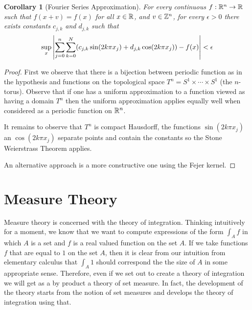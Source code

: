 \documentclass{amsart}
\newtheorem{cor}[thm]{Corollary}
\theoremstyle{remark}
\theoremstyle{definition}
\begin{document}
\begin{cor}[Fourier Series Approximation]\label{FourierSeries}For
  every continuous $f : \mathbb{R}^n \to \mathbb{R}$ such that $f(x + v) =
  f(x)$ for all $x \in \mathbb{R}$, and $v \in \mathbb{Z}^n$, for every
$\epsilon > 0$  there exists constants $c_{j,k}$ and
$d_{j,k}$ such that 
\begin{align*}
\sup_x \left \vert \sum_{j=0}^n \sum_{k=0}^N (c_{j,k} \sin(2k\pi x_j) + d_{j,k}
\cos(2k\pi x_j)) - f(x) \right \vert < \epsilon
\end{align*}
\end{cor}
\begin{proof}First we observe that there is a bijection between
  periodic function as in the hypothesis and functions on the
  topological space $T^n = S^1 \times \cdots \times S^1$ (the $n$-torus).
Observe that if one has a uniform approximation to a function
viewed as having a domain $T^n$ then the uniform approximation applies
equally well when considered as a periodic function on $\mathbb{R}^n$.

It remains to observe that $T^n$ is compact Hausdorff, the functions $\sin(2k\pi x_j)$ an $\cos(2k
\pi x_j)$ separate points and contain the constants so the Stone Weierstrass
Theorem applies.

An alternative approach is a more constructive one using the Fejer kernel.
\end{proof}
\section{Measure Theory}
Measure theory is concerned with the theory of integration.  Thinking
intuitively for a moment, we know that we want to compute
expressions of the form $\int_A f$ in which $A$ is a set and $f$ is a
real valued function on the set $A$.  If we take functions $f$ that
are equal to $1$ on the set $A$, then it is clear from our intuition
from elementary calculus that $\int_A 1$ should correspond the the
size of $A$ in some appropriate sense.  Therefore, even if we set out
to create a theory of integration we will get as a by product a theory
of set measure.  In fact, the development of the theory starts from
the notion of set measures and develops the theory of integration
using that.
\end{document}
